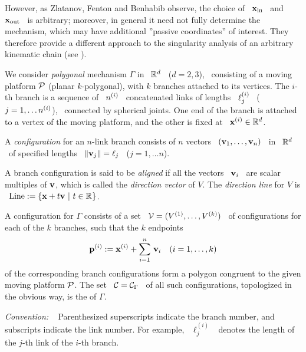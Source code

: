 However, as Zlatanov, Fenton and Benhabib observe, the choice of \
$\mathbf{x}_{\operatorname{in}}$ \ and \ $\mathbf{x}_{\operatorname{out}}$ \ is arbitrary; moreover, in
general it need not fully determine the mechanism, which may have
additional ''passive coordinates'' of interest. They therefore provide
a different approach to the singularity analysis of an arbitrary
kinematic chain (see \cite{ZFB1}).

%
%
 \label{cts}

We consider \emph{polygonal} mechanism $\Gamma$ in \ $\mathbb{R}^{d}$ \
($d=2,3$), \ consisting of a moving platform $\mathcal{P}$ (planar
$k$-polygonal), with $k$ branches attached to its vertices. The
$i$-th branch is a sequence of \ $n\sp{({i})}$ \ concatenated links of
lengths \ $\ell\sp{({i})}_{j}$ \ ($j=1,\dotsc n\sp{({i})}$), \ connected by
spherical joints. One end of the branch is attached to a vertex of
the moving platform, and the other is fixed  at \
$\mathbf{x}\sp{({i})}\in\mathbb{R}^{d}$.

\begin{defn}
%
A \emph{configuration} for an $n$-link branch consists of $n$
vectors \ $(\mathbf{v}_{1},\dotsc,\mathbf{v}_{n})$ \ in \ $\mathbb{R}^{d}$ \ of
specified lengths \ $\|\mathbf{v}_{j}\|=\ell_{j}$ \ ($j=1,\dotsc n$). \

A branch configuration is said to be \emph{aligned} if all the
vectors \ $\mathbf{v}_{i}$ \ are scalar multiples of $\mathbf{v}$, which is
called the \emph{direction vector} of $V$. The \emph{direction
line} for $V$ is \ $\Line:=\{\bx+t\bv~|\ t\in\RRR^{}\}$.

A configuration for $\Gamma$ consists of a set \
$\mathcal{V}=(V\sp{({1})},\dotsc,V\sp{({k})})$ \ of configurations for each of the $k$
branches, such that the $k$ endpoints
%
$$
\ppj{i}:=\xj{i}+\sum_{i=1}^{n}\,\bv_{i} \ \ \ (i=1,\dotsc,k)
$$
of the corresponding branch configurations form a polygon congruent to the
given moving platform $\mathcal{P}$. The set \ $\mathcal{C}=\mathcal{C}_{\Gamma}$ \ of all such
configurations, topologized in the obvious way, is the \emph{\cspace}
of $\Gamma$.
%
\end{defn}

\textit{Convention:} \
%
Parenthesized superscripts indicate the branch
number, and subscripts indicate the link number. For example, \
$\ell_{j}^{(i)}$ \ denotes the length of the $j$-th link of the $i$-th
branch.

